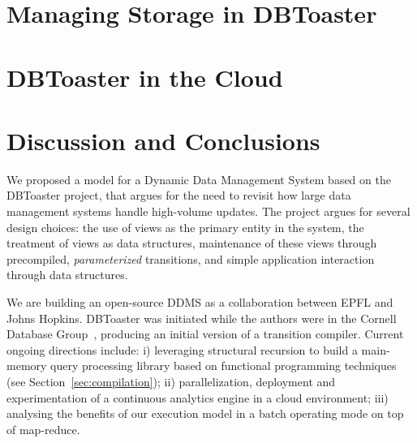 \documentclass{sig-alternate}
\newcommand{\tinysection}[1]{\vspace{0.5mm}\noindent{\bf #1.}}
\begin{document}
\section{Managing Storage in DBToaster}
\label{sec:storage}



\section{DBToaster in the Cloud}
\label{sec:distribution}


\section{Discussion and Conclusions}
We proposed a model for a Dynamic Data Management System based on the DBToaster
project, that argues for the need to revisit how large data management systems
handle high-volume updates. The project argues for several design choices: the
use of views as the primary entity in the system, the treatment of
views as data structures, maintenance of these views through precompiled,
\textit{parameterized} transitions, and simple application interaction
through data structures. 

\tinysection{Implementation plan}
We are building an open-source DDMS as a collaboration between EPFL and Johns
Hopkins.
DBToaster was initiated while the authors were in the Cornell Database
Group~\cite{ahmad-vldb:09}, producing an initial version of a
transition compiler. Current ongoing directions include: i) leveraging
structural recursion to build a main-memory query processing library based on
functional programming techniques (see Section~\ref{sec:compilation}); ii)
parallelization, deployment and experimentation of a continuous analytics engine
in a cloud environment; iii) analysing the benefits of our execution model in a
batch operating mode on top of map-reduce.



\scriptsize{


}
\end{document}
